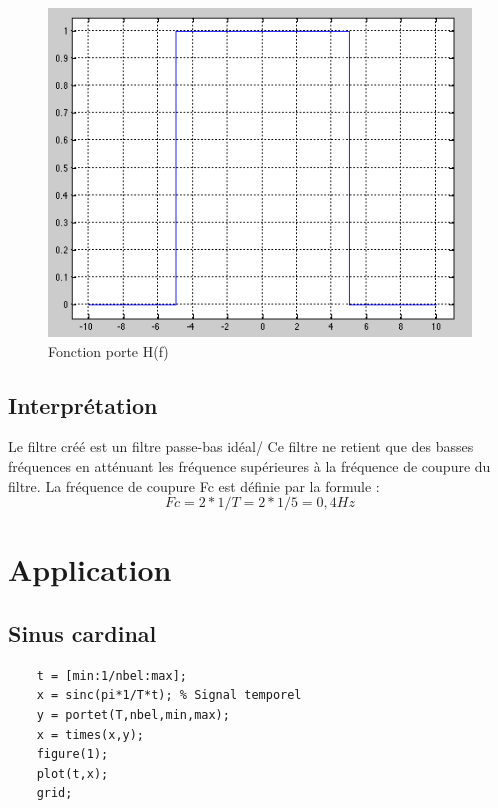 \documentclass[a4paper, oneside]{report}
\begin{document}
  \begin{figure}[h]
   \centering
    \includegraphics[scale=0.75]{images/portef.png}
    \caption{Fonction porte H(f)}
  \end{figure}
  
  \section{Interpr\'etation}
Le filtre cr\'e\'e est un filtre passe-bas id\'eal/
Ce filtre ne retient que des basses fr\'equences en att\'enuant les fr\'equence sup\'erieures \`a la fr\'equence de coupure du filtre.
La fr\'equence de coupure Fc est d\'efinie par la formule : \\
$$Fc=2*1/T=2*1/5=0,4 Hz$$
  
\newpage{}
\chapter{Application}
 	\section{Sinus cardinal}
		
\begin{lstlisting}
    t = [min:1/nbel:max];
    x = sinc(pi*1/T*t); % Signal temporel
    y = portet(T,nbel,min,max);
    x = times(x,y);
    figure(1);
    plot(t,x);
    grid;
\end{lstlisting}
		
\end{document}

